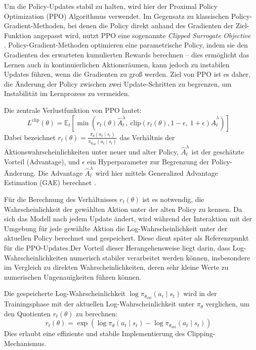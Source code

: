 Um die Policy-Updates stabil zu halten, wird hier der Proximal Policy Optimization (PPO) Algorithmus verwendet. Im Gegensatz zu klassischen Policy-Gradient-Methoden, bei denen die Policy direkt anhand des Gradienten der Ziel-Funktion angepasst wird, nutzt PPO eine sogenannte \emph{Clipped Surrogate Objective} \cite{schulman2017proximalpolicyoptimizationalgorithms}. Policy-Gradient-Methoden optimieren eine parametrische Policy, indem sie den Gradienten des erwarteten kumulierten Rewards berechnen – dies ermöglicht das Lernen auch in kontinuierlichen Aktionsräumen, kann jedoch zu instabilen Updates führen, wenn die Gradienten zu groß werden. Ziel von PPO ist es daher, die Änderung der Policy zwischen zwei Update-Schritten zu begrenzen, um Instabilität im Lernprozess zu vermeiden.

Die zentrale Verlustfunktion von PPO lautet:
\[
L^{\mathrm{clip}}(\theta) = \mathbb{E}_t \left[ 
\min \left( 
r_t(\theta) \hat{A}_t^\lambda,\ 
\mathrm{clip}\left( r_t(\theta), 1 - \epsilon,\ 1 + \epsilon \right) \hat{A}_t^\lambda
\right) 
\right]
\]
Dabei bezeichnet 
\(
r_t(\theta) = \frac{\pi_\theta(a_t \mid s_t)}{\pi_{\theta_{\text{old}}}(a_t \mid s_t)}
\)
das Verhältnis der Aktionswahrscheinlichkeiten unter neuer und alter Policy, 
\(
\hat{A}_t^\lambda
\)
ist der geschätzte Vorteil (Advantage), und 
\(
\epsilon
\)
ein Hyperparameter zur Begrenzung der Policy-Änderung. Die Advantage $\hat{A}_t^\lambda $ wird hier mittels Generalized Advantage Estimation (GAE) berechnet \cite{schulman2018highdimensionalcontinuouscontrolusing}.

Für die Berechnung des Verhältnisses \( r_t(\theta) \) ist es notwendig, die Wahrscheinlichkeit der gewählten Aktion unter der alten Policy zu kennen. Da sich das Modell nach jedem Update ändert, wird während der Interaktion mit der Umgebung für jede gewählte Aktion die Log-Wahrscheinlichkeit unter der aktuellen Policy berechnet und gespeichert. Diese dient später als Referenzpunkt für die PPO-Updates.Der Vorteil dieser Herangehensweise liegt darin, dass Log-Wahrscheinlichkeiten numerisch stabiler verarbeitet werden können, insbesondere im Vergleich zu direkten Wahrscheinlichkeiten, deren sehr kleine Werte zu numerischen Ungenauigkeiten führen können. 

Die gespeicherte Log-Wahrscheinlichkeit \( \log \pi_{\theta_{\text{old}}}(a_t \mid s_t) \) wird in der Trainingsphase mit der aktuellen Log-Wahrscheinlichkeit unter \( \pi_{\theta} \) verglichen, um den Quotienten \( r_t(\theta) \) zu berechnen:
\[
r_t(\theta) = \exp\left( \log \pi_{\theta}(a_t \mid s_t) - \log \pi_{\theta_{\text{old}}}(a_t \mid s_t) \right)
\]
Dies erlaubt eine effiziente und stabile Implementierung des Clipping-Mechanismus.



